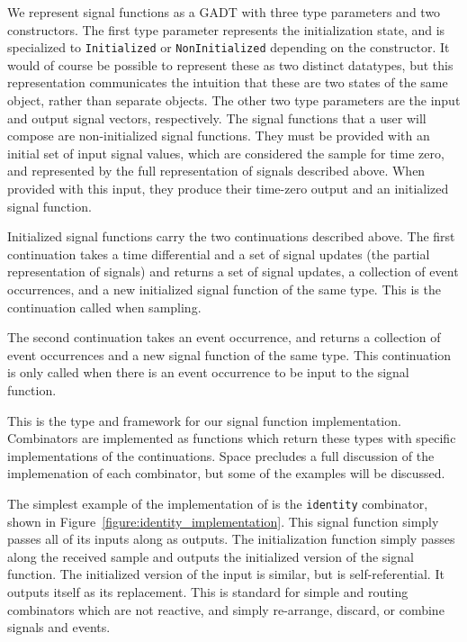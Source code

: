 We represent signal functions as a GADT with three type parameters and two 
constructors. The first type parameter represents the initialization state,
and is specialized to {\tt Initialized} or {\tt NonInitialized} depending on the
constructor. It would of course be possible to represent these as two distinct
datatypes, but this representation communicates the intuition that these are
two states of the same object, rather than separate objects. The other two type
parameters are the input and output signal vectors, respectively. The signal
functions that a user will compose are non-initialized signal functions.
They must be provided with an initial set of input signal values, which are considered
the sample for time zero, and represented by the full representation of signals
described above. When provided with this input, they produce their time-zero
output and an initialized signal function.

Initialized signal functions carry the two continuations described above.
The first continuation takes a time differential and a set of signal updates
(the partial representation of signals) and returns a set of signal updates, a
collection of event occurrences, and a new initialized signal function of the
same type. This is the continuation called when sampling.

The second continuation takes an event occurrence, and returns a collection of
event occurrences and a new signal function of the same type. This continuation
is only called when there is an event occurrence to be input to the signal
function.

This is the type and framework for our signal function implementation.
Combinators are implemented as functions which return these types with specific
implementations of the continuations. Space precludes a full discussion of the
implemenation of each combinator, but some of the examples will be discussed.

The simplest example of the implementation of is the {\tt identity} combinator,
shown in Figure~\ref{figure:identity_implementation}. This signal function
simply passes all of its inputs along as outputs. The initialization function
simply passes along the received sample and outputs the initialized version of
the signal function. The initialized version of the input is similar, but is
self-referential. It outputs itself as its replacement. This is standard for
simple and routing combinators which are not reactive, and simply re-arrange,
discard, or combine signals and events.

